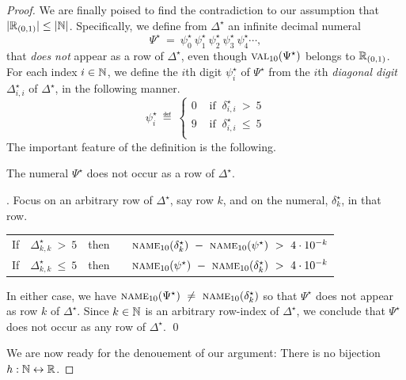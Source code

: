 \begin{proof}
We are finally poised to find the contradiction to our assumption that $|\mathbb{R}_{(0,1)}| \leq |\mathbb{N}|$.  Specifically, we define from $\Delta^\star$ an infinite decimal numeral
\[ \Psi^\star \ = \ \psi^\star_0 \ \psi^\star_1 \ \psi^\star_2 \ \psi^\star_3 \ \psi^\star_4 \cdots, \]
that {\em does not} appear as a row of $\Delta^\star$, even though $\mbox{\sc val}_{10}(\Psi^\star)$ belongs to $\mathbb{R}_{(0,1)}$.  For each index $i \in \mathbb{N}$, we define the $i$th digit $\psi^\star_i$ of $\Psi^\star$ from the $i$th {\em diagonal digit} $\Delta^\star_{i,i}$ of $\Delta^\star$, in the following manner.
\[ \psi^\star_i \ \eqdef \
\left\{
\begin{array}{cc}
0 & \mbox{ if } \ \delta^\star_{i,i} \ > \ 5 \\
9 & \mbox{ if } \ \delta^\star_{i,i} \ \leq \ 5 \\
\end{array}
\right.
\]
The important feature of the definition is the following.

\begin{lemma}
\label{lem:PSI-notin-DELTA-num}
The numeral $\Psi^\star$ does not occur as a row of $\Delta^\star$.
\end{lemma}

.
Focus on an arbitrary row of $\Delta^\star$, say row $k$, and on the numeral, $\delta^\star_k$, in that row.

\medskip

\begin{tabular}{lclc}
If & $\Delta^\star_{k,k} \ > \ 5$ & then & \ \
$\mbox{\sc name}_{10}(\delta^\star_k) \ - \ \mbox{\sc name}_{10}(\psi^\star) \ > \ 4 \cdot 10^{-k}$ \\
If & $\Delta^\star_{k,k} \ \leq \ 5$ & then & \ \
$\mbox{\sc name}_{10}(\psi^\star) \ - \ \mbox{\sc name}_{10}(\delta^\star_k) \ > \ 4
\cdot 10^{-k}$
\end{tabular}

\medskip

\noindent
In either case, we have $\mbox{\sc name}_{10}(\Psi^\star) \ \neq \ \mbox{\sc name}_{10}(\delta^\star_k)$ so that $\Psi^\star$ does not appear as row $k$ of $\Delta^\star$.  Since $k \in \mathbb{N}$ is an arbitrary row-index of $\Delta^\star$, we conclude that $\Psi^\star$ does not occur as any row of $\Delta^\star$.  \qed

\medskip

We are now ready for the denouement of our argument: There is no bijection $h: \mathbb{N} \leftrightarrow \mathbb{R}$.


\end{proof}
